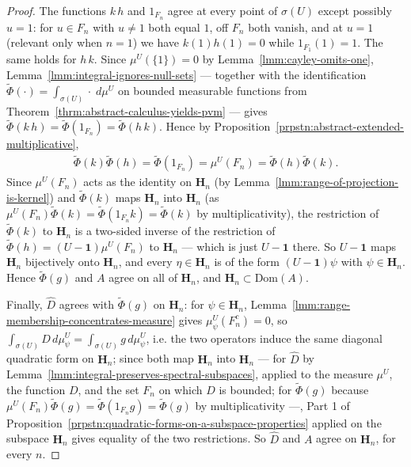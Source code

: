 \begin{proof}
The functions $k\,h$ and $1_{F_n}$ agree at every point of $\sigma(U)$ except possibly $u = 1$: for $u \in F_n$ with $u \ne 1$ both equal $1$, off $F_n$ both vanish, and at $u=1$ (relevant only when $n = 1$) we have $k(1)h(1) = 0$ while $1_{F_1}(1) = 1$. The same holds for $h\,k$. Since $\mu^U(\{1\}) = 0$ by Lemma~\ref{lmm:cayley-omits-one}, Lemma~\ref{lmm:integral-ignores-null-sets} — together with the identification $\widetilde\Phi(\cdot) = \int_{\sigma(U)} \cdot \; d\mu^U$ on bounded measurable functions from Theorem~\ref{thrm:abstract-calculus-yields-pvm} — gives $\widetilde\Phi(k\,h) = \widetilde\Phi(1_{F_n}) = \widetilde\Phi(h\,k)$. Hence by Proposition~\ref{prpstn:abstract-extended-multiplicative},
\begin{align}
    \widetilde\Phi(k)\widetilde\Phi(h) = \widetilde\Phi(1_{F_n}) = \mu^U(F_n) = \widetilde\Phi(h)\widetilde\Phi(k).
\end{align}
Since $\mu^U(F_n)$ acts as the identity on $\mathbf{H}_n$ (by Lemma~\ref{lmm:range-of-projection-is-kernel}) and $\widetilde\Phi(k)$ maps $\mathbf{H}_n$ into $\mathbf{H}_n$ (as $\mu^U(F_n)\widetilde\Phi(k) = \widetilde\Phi(1_{F_n}k) = \widetilde\Phi(k)$ by multiplicativity), the restriction of $\widetilde\Phi(k)$ to $\mathbf{H}_n$ is a two-sided inverse of the restriction of $\widetilde\Phi(h) = (U-\mathbf{1})\mu^U(F_n)$ to $\mathbf{H}_n$ — which is just $U - \mathbf{1}$ there. So $U-\mathbf{1}$ maps $\mathbf{H}_n$ bijectively onto $\mathbf{H}_n$, and every $\eta \in \mathbf{H}_n$ is of the form $(U-\mathbf{1})\psi$ with $\psi \in \mathbf{H}_n$. Hence $\widetilde\Phi(g)$ and $A$ agree on all of $\mathbf{H}_n$, and $\mathbf{H}_n \subset \text{Dom}(A)$.

Finally, $\widehat{D}$ agrees with $\widetilde\Phi(g)$ on $\mathbf{H}_n$: for $\psi \in \mathbf{H}_n$, Lemma~\ref{lmm:range-membership-concentrates-measure} gives $\mu^U_\psi(F_n^c) = 0$, so $\int_{\sigma(U)} D \, d\mu^U_\psi = \int_{\sigma(U)} g \, d\mu^U_\psi$, i.e. the two operators induce the same diagonal quadratic form on $\mathbf{H}_n$; since both map $\mathbf{H}_n$ into $\mathbf{H}_n$ — for $\widehat{D}$ by Lemma~\ref{lmm:integral-preserves-spectral-subspaces}, applied to the measure $\mu^U$, the function $D$, and the set $F_n$ on which $D$ is bounded; for $\widetilde\Phi(g)$ because $\mu^U(F_n)\widetilde\Phi(g) = \widetilde\Phi(1_{F_n}g) = \widetilde\Phi(g)$ by multiplicativity —, Part 1 of Proposition~\ref{prpstn:quadratic-forms-on-a-subspace-properties} applied on the subspace $\mathbf{H}_n$ gives equality of the two restrictions. So $\widehat{D}$ and $A$ agree on $\mathbf{H}_n$, for every $n$.


\end{proof}
